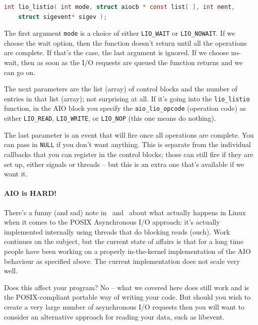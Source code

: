 \documentclass[a4paper]{report}
\begin{document}
\begin{lstlisting}[language=C]
int lio_listio( int mode, struct aiocb * const list[ ], int nent, 
    struct sigevent* sigev );
\end{lstlisting}

The first argument \texttt{mode} is a choice of either \texttt{LIO\_WAIT} or \texttt{LIO\_NOWAIT}. If we choose the wait option, then the function doesn't return until all the operations are complete. If that's the case, the last argument is ignored. If we choose no-wait, then as soon as the I/O requests are queued the function returns and we can go on.

The next parameters are the list (array) of control blocks and the number of entries in that list (array); not surprising at all. If it's going into the \texttt{lio\_listio} function, in the AIO block you specify the \texttt{aio\_lio\_opcode} (operation code) as either \texttt{LIO\_READ}, \texttt{LIO\_WRITE}, or \texttt{LIO\_NOP} (this one means do nothing).

The last parameter is an event that will fire once all operations are complete. You can pass in \texttt{NULL} if you don't want anything. This is separate from the individual callbacks that you can register in the control blocks; those can still fire if they are set up, either signals or threads -- but this is an extra one that's available if we want it.

\paragraph{AIO is HARD!}
There's a funny (and sad) note in~\cite{lpi} and~\cite{linuxaio} about what actually happens in Linux when it comes to the POSIX Asynchronous I/O approach: it's actually implemented internally using threads that do blocking reads (ouch). Work continues on the subject, but the current state of affairs is that for a long time people have been working on a properly in-the-kernel implementation of the AIO behaviour as specified above. The current implementation does not scale very well.

Does this affect your program? No -- what we covered here does still work and is the POSIX-compliant portable way of writing your code. But should you wish to create a very large number of asynchronous I/O requests then you will want to consider an alternative approach for reading your data, such as libevent.
\end{document}
